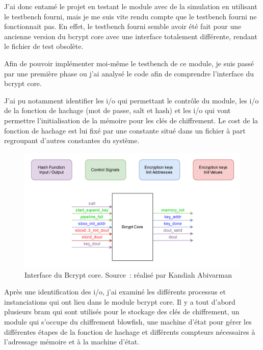J'ai donc entamé le projet en testant le module avec de la simulation en utilisant le testbench fourni, mais je me suis vite rendu compte que le testbench fourni ne fonctionnait pas. 
En effet, le testbench fourni semble avoir été fait pour une ancienne version du bcrypt core avec une interface totalement différente, rendant le fichier de test obsolète.

Afin de pouvoir implémenter moi-même le testbench de ce module, je suis passé par une première phase ou j'ai analysé le code afin de comprendre l'interface du bcrypt core.

J'ai pu notamment identifier les \gls{i/o} qui permettant le contrôle du module, les \gls{i/o} de la fonction de hachage (mot de passe, salt et hash) et les \gls{i/o} qui vont permettre l'initialisation de la mémoire pour les clés de chiffrement. 
Le cost de la fonction de hachage est lui fixé par une constante situé dans un fichier à part regroupant d'autres constantes du système.

\begin{figure}[tbph!]
	\centering
	\includegraphics[width=0.9\linewidth]{bcrypt_core_interface}
	\caption[Interface du Bcrypt core]{Interface du Bcrypt core. Source : réalisé par Kandiah Abivarman}
	\label{fig:bcrypt_core_interface}
\end{figure}


Après une identification des \gls{i/o}, j'ai examiné les différents processus et instanciations qui ont lieu dans le module bcrypt core. 
Il y a tout d'abord plusieurs \gls{bram} qui sont utilisés pour le stockage des clés de chiffrement, un module qui s'occupe du chiffrement blowfish, une machine d'état pour gérer les différentes étapes de la fonction de hachage et différents compteurs nécessaires à l'adressage mémoire et à la machine d'état.

\newpage

